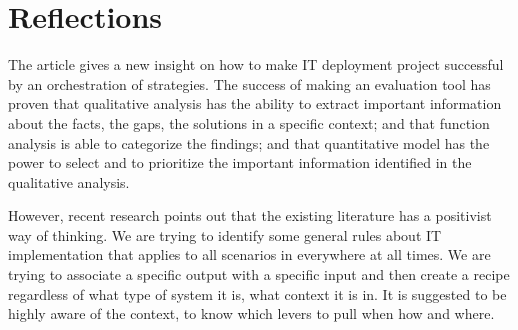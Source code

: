 
\section{Reflections}

The article gives a new insight on how to make IT deployment project successful by an orchestration of strategies. The success of making an evaluation tool has proven that qualitative analysis has the ability to extract important information about the facts, the gaps, the solutions in a specific context; and that function analysis is able to categorize the findings; and that quantitative model has the power to select and to prioritize the important information identified in the qualitative analysis.

However, recent research points out that the existing literature has a positivist way of thinking. We are trying to identify some general rules about IT implementation that applies to all scenarios in everywhere at all times. We are trying to associate a specific output with a specific input and then create a recipe regardless of what type of system it is, what context it is in. It is suggested to be highly aware of the context, to know which levers to pull when how and where\parencite{6}.
